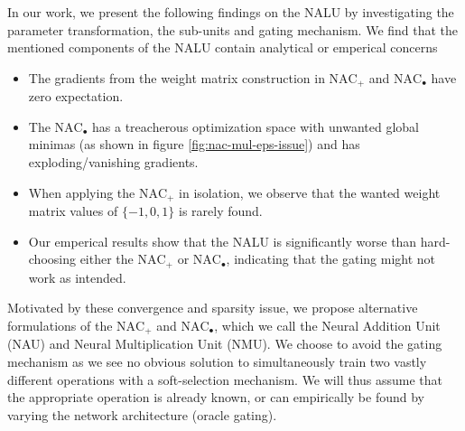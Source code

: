 In our work, we present the following findings on the NALU by investigating the parameter transformation, the sub-units and gating mechanism.
We find that the mentioned components of the NALU contain analytical or emperical concerns
\begin{itemize}[leftmargin=0.5cm,itemsep=0pt,topsep=0pt]
\item The gradients from the weight matrix construction in $\text{NAC}_{+}$ and $\text{NAC}_{\bullet}$ have zero expectation.

\item The $\text{NAC}_{\bullet}$ has a treacherous optimization space with unwanted global minimas (as shown in figure \ref{fig:nac-mul-eps-issue}) and has exploding/vanishing gradients.

\item When applying the $\text{NAC}_{+}$ in isolation, we observe that the wanted weight matrix values of $\{-1, 0, 1\}$ is rarely found.

\item Our emperical results show that the NALU is significantly worse than hard-choosing either the $\text{NAC}_{+}$ or $\text{NAC}_{\bullet}$, indicating that the gating might not work as intended.
\end{itemize}
Motivated by these convergence and sparsity issue, we propose alternative formulations of the $\text{NAC}_{+}$ and $\text{NAC}_{\bullet}$, which we call the Neural Addition Unit (NAU) and Neural Multiplication Unit (NMU).
We choose to avoid the gating mechanism as we see no obvious solution to simultaneously train two vastly different operations with a soft-selection mechanism.
We will thus assume that the appropriate operation is already known, or can empirically be found by varying the network architecture (oracle gating).


